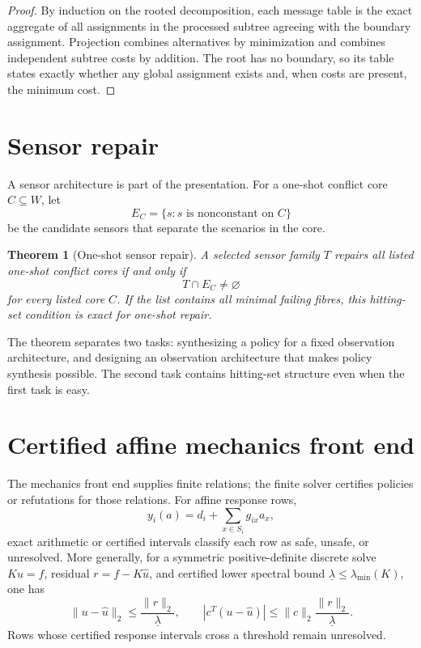 \documentclass[11pt]{article}
\theoremstyle{plain}
\newtheorem{theorem}{Theorem}[section]
\theoremstyle{definition}
\theoremstyle{remark}
\begin{document}
\begin{proof}
By induction on the rooted decomposition, each message table is the exact
aggregate of all assignments in the processed subtree agreeing with the boundary
assignment.  Projection combines alternatives by minimization and combines
independent subtree costs by addition.  The root has no boundary, so its table
states exactly whether any global assignment exists and, when costs are present,
the minimum cost.
\end{proof}

\section{Sensor repair}
\label{sec:sensor-repair}

A sensor architecture is part of the presentation.  For a one-shot conflict core
\(C\subseteq W\), let
\[
  E_C=\{s:s\text{ is nonconstant on }C\}
\]
be the candidate sensors that separate the scenarios in the core.

\begin{theorem}[One-shot sensor repair]
A selected sensor family \(T\) repairs all listed one-shot conflict cores if and
only if
\[
  T\cap E_C\ne\varnothing
\]
for every listed core \(C\).  If the list contains all minimal failing fibres,
this hitting-set condition is exact for one-shot repair.
\end{theorem}

The theorem separates two tasks: synthesizing a policy for a fixed observation
architecture, and designing an observation architecture that makes policy
synthesis possible.  The second task contains hitting-set structure even when
the first task is easy.

\section{Certified affine mechanics front end}
\label{sec:mechanics-front-end}

The mechanics front end supplies finite relations; the finite solver certifies
policies or refutations for those relations.  For affine response rows,
\[
  y_i(a)=d_i+\sum_{x\in S_i}g_{ix}a_x,
\]
exact arithmetic or certified intervals classify each row as safe, unsafe, or
unresolved.  More generally, for a symmetric positive-definite discrete solve
\(Ku=f\), residual \(r=f-K\widehat u\), and certified lower spectral bound
\(\underline\lambda\le\lambda_{
\min}(K)\), one has
\[
  \|u-\widehat u\|_2\le \frac{\|r\|_2}{\underline\lambda},
  \qquad
  |c^T(u-\widehat u)|\le
  \|c\|_2\frac{\|r\|_2}{\underline\lambda}.
\]
Rows whose certified response intervals cross a threshold remain unresolved.
\end{document}
